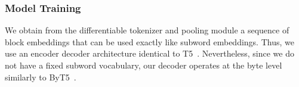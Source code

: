 
\subsubsection{Model Training}

We obtain from the differentiable tokenizer and pooling module a sequence of block embeddings that can be used exactly like subword embeddings. Thus, we use an encoder decoder architecture identical to T5~\citep{raffel2020t5}. Nevertheless, since we do not have a fixed subword vocabulary, our decoder operates at the byte level similarly to ByT5~\citep{xue2022byt5}.





